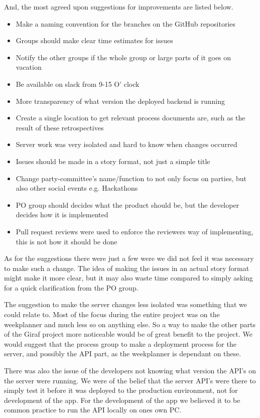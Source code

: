And, the most agreed upon suggestions for improvements are listed below.
\begin{itemize}
  \item Make a naming convention for the branches on the GitHub repositories
  \item Groups should make clear time estimates for issues
  \item Notify the other groups if the whole group or large parts of it goes on vacation
  \item Be available on slack from 9-15 O' clock
  \item More transparency of what version the deployed backend is running
  \item Create a single location to get relevant process documents are, such as the result of these retrospectives
  \item Server work was very isolated and hard to know when changes occurred
  \item Issues should be made in a story format, not just a simple title
  \item Change party-committee's name/function to not only focus on parties, but also other social events e.g. Hackathons
  \item PO group should decides what the product should be, but the developer decides how it is implemented
  \item Pull request reviews were used to enforce the reviewers way of implementing, this is not how it should be done
\end{itemize}

As for the suggestions there were just a few were we did not feel it was necessary to make such a change.
The idea of making the issues in an actual story format might make it more clear, but it may also waste time compared to simply asking for a quick clarification from the PO group. 

The suggestion to make the server changes less isolated was something that we could relate to.
Most of the focus during the entire project was on the weekplanner and much less so on anything else.
So a way to make the other parts of the Giraf project more noticeable would be of great benefit to the project.
We would suggest that the process group to make a deployment process for the server, and possibly the API part, as the weekplanner is dependant on these.

There was also the issue of the developers not knowing what version the API's on the server were running.
We were of the belief that the server API's were there to simply test it before it was deployed to the production environment, not for development of the app.
For the development of the app we believed it to be common practice to run the API locally on ones own PC.


